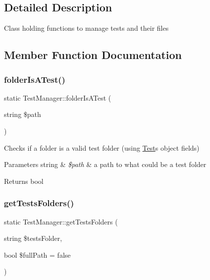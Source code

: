 \subsection{Detailed Description}
Class holding functions to manage tests and their files 

\subsection{Member Function Documentation}
\mbox{\label{classTestManager_a0f62639ed81588be321cafc0a23ac290}} 
\subsubsection{\texorpdfstring{folder\+Is\+A\+Test()}{folderIsATest()}}
{\footnotesize\ttfamily static Test\+Manager\+::folder\+Is\+A\+Test (\begin{DoxyParamCaption}\item[{string}]{\$path }\end{DoxyParamCaption})\hspace{0.3cm}{\ttfamily [static]}}

Checks if a folder is a valid test folder (using \hyperlink{classTest}{Test}\textquotesingle{}s object fields) 
\begin{DoxyParams}[1]{Parameters}
string & {\em \$path} & a path to what could be a test folder \\
\hline
\end{DoxyParams}
\begin{DoxyReturn}{Returns}
bool 
\end{DoxyReturn}
\mbox{\label{classTestManager_aa6ec0809a03f384869c41f51507a2fd4}} 
\subsubsection{\texorpdfstring{get\+Tests\+Folders()}{getTestsFolders()}}
{\footnotesize\ttfamily static Test\+Manager\+::get\+Tests\+Folders (\begin{DoxyParamCaption}\item[{string}]{\$tests\+Folder,  }\item[{bool}]{\$full\+Path = {\ttfamily false} }\end{DoxyParamCaption})\hspace{0.3cm}{\ttfamily [static]}}

